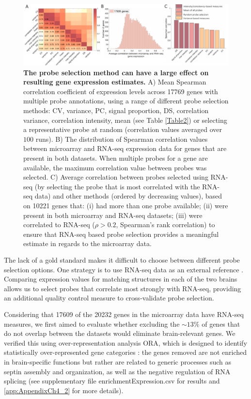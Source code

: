 \begin{figure}[h!]
  \centering
    \includegraphics[width=1\textwidth]{Chapter4/Ch4Fig4.pdf}
\caption{\textbf{The probe selection method can have a large effect on resulting gene expression estimates.}
A) Mean Spearman correlation coefficient of expression levels across \num{17769} genes with multiple probe annotations, using a range of different probe selection methods: CV, variance, PC, signal proportion, DS, correlation variance, correlation intensity, mean (see Table \ref{Table2}) or selecting a representative probe at random (correlation values averaged over $100$ runs).
B) The distribution of Spearman correlation values between microarray and RNA-seq expression data for genes that are present in both datasets. When multiple probes for a gene are available, the maximum correlation value between probes was selected.
C) Average correlation between probes selected using RNA-seq (by selecting the probe that is most correlated with the RNA-seq data) and other methods (ordered by decreasing values), based on \num{10221} genes that: (i) had more than one probe available; (ii) were present in both microarray and RNA-seq datasets; (iii) were correlated to RNA-seq ($\rho > 0.2$, Spearman’s rank correlation) to ensure that RNA-seq based probe selection provides a meaningful estimate in regards to the microarray data.}
\label{fig:Ch4Fig4}
\end{figure}

The lack of a gold standard makes it difficult to choose between different probe selection options. One strategy is to use RNA-seq data as an external reference \citep{Miller2014a}. Comparing expression values for matching structures in each of the two brains allows us to select probes that correlate most strongly with RNA-seq, providing an additional quality control measure to cross-validate probe selection.

Considering that \num{17609} of the \num{20232} genes in the microarray data have RNA-seq measures, we first aimed to evaluate whether excluding the $\sim13\%$ of genes that do not overlap between the datasets would eliminate brain-relevant genes. We verified this using over-representation analysis ORA, which is designed to identify statistically over-represented gene categories \citep{Gillis2010}: the genes removed are not enriched in brain-specific functions but rather are related to generic processes such as septin assembly and organization, as well as the negative regulation of RNA splicing (see supplementary file enrichmentExpression.csv for results and \ref{app:AppendixCh4_2} for more details).

